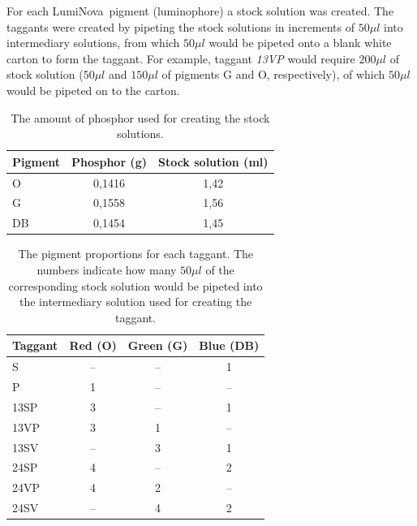 \documentclass[thesis.tex]{subfiles}
\begin{document}
For each LumiNova\textregistered\ pigment (luminophore) a stock solution was created. The taggants were created by pipeting the stock solutions in increments of $50\mu l$ into intermediary solutions, from which $50\mu l$ would be pipeted onto a blank white carton to form the taggant. For example, taggant \emph{13VP} would require $200\mu l$ of stock solution ($50\mu l$ and $150\mu l$ of pigments G and O, respectively), of which $50\mu l$ would be pipeted on to the carton.
\vspace{-1em}
\begin{table}[ht]
  \caption{The amount of phosphor used for creating the stock solutions.}

  \begin{center}
  \begin{tabular}{| m{1.75cm} | c | c |}
    \hline
    \textbf{Pigment}  & \textbf{Phosphor (g)} & \textbf{Stock solution (ml)} \\ \hline
    O & 0,1416 & 1,42 \\
    \hline
    G & 0,1558 & 1,56 \\
    \hline
    DB & 0,1454 & 1,45 \\
    \hline
  \end{tabular}
  \end{center}
\end{table}
\vspace{-2.75em}
\begin{table}[ht]
  \caption{The pigment proportions for each taggant. The numbers indicate how many $50\mu l$ of the corresponding stock solution would be pipeted into the intermediary solution used for creating the taggant.}

  \begin{center}
  \begin{tabular}{| m{1.75cm} | c | c | c |}
    \hline
    \textbf{Taggant}  & \textbf{Red (O)} & \textbf{Green (G)} & \textbf{Blue (DB)} \\ \hline
    S & -- & -- & 1 \\
    \hline
    P & 1 & -- & -- \\
    \hline
    13SP & 3 & -- & 1 \\
    \hline
    13VP & 3 & 1 & -- \\
    \hline
    13SV & -- & 3 & 1 \\
    \hline
    24SP & 4 & -- & 2 \\
    \hline
    24VP  & 4 & 2 & -- \\
    \hline
    24SV & -- & 4 & 2 \\
    \hline
  \end{tabular}
  \end{center}
\end{table}
\end{document}
